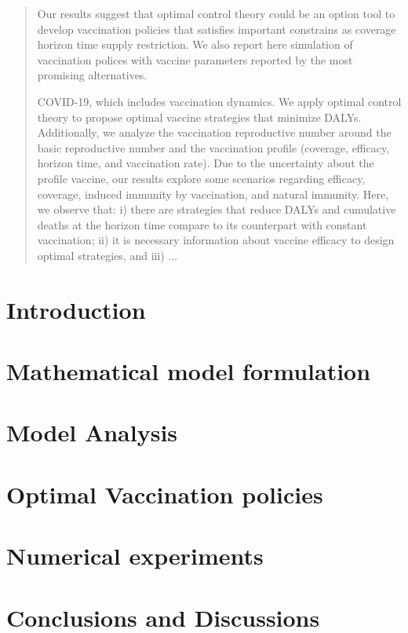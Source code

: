 \documentclass[3p, sort&compress]{elsarticle}
\begin{document}
\begin{frontmatter}
\begin{abstract}
        Our results suggest that optimal control theory could be an option
        tool to develop  vaccination policies that satisfies important
        constrains as coverage horizon time supply restriction. We also report
        here simulation of vaccination polices with vaccine parameters reported
        by the most promising alternatives.

        COVID-19, which includes vaccination dynamics. We apply optimal control
        theory to propose optimal vaccine strategies that minimize DALYs.
        Additionally, we analyze the vaccination reproductive number around the
        basic reproductive number and the vaccination profile (coverage,
        efficacy,
        horizon time, and vaccination rate). Due to the uncertainty about the
        profile vaccine, our results explore some scenarios regarding efficacy,
        coverage, induced immunity by vaccination, and natural immunity. Here,
        we
        observe that: i) there are strategies that reduce DALYs and cumulative
        deaths at the horizon time compare to its counterpart with constant
        vaccination; ii) it is necessary information about vaccine efficacy to
        design optimal strategies, and iii) ...
    \end{abstract}
\end{frontmatter}
%
    \section{Introduction}
        
    \section{Mathematical model formulation}
        
    \section{Model Analysis}
        
    \section{Optimal Vaccination
    policies}
        
    \section{Numerical experiments}
        
    \section{Conclusions and Discussions}
        
\end{document}
